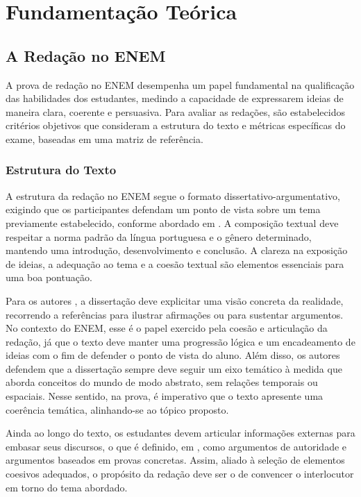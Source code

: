 \chapter{Fundamentação Teórica}

\section{A Redação no ENEM}

A prova de redação no ENEM desempenha um papel fundamental na qualificação das habilidades dos estudantes, medindo a capacidade de expressarem ideias de maneira clara, coerente e persuasiva. Para avaliar as redações, são estabelecidos critérios objetivos que consideram a estrutura do texto e métricas específicas do exame, baseadas em uma matriz de referência.

\subsection{Estrutura do Texto}

A estrutura da redação no ENEM segue o formato dissertativo-argumentativo, exigindo que os participantes defendam um ponto de vista sobre um tema previamente estabelecido, conforme abordado em \cite{cartilha-redacao}. A composição textual deve respeitar a norma padrão da língua portuguesa e o gênero determinado, mantendo uma introdução, desenvolvimento e conclusão. A clareza na exposição de ideias, a adequação ao tema e a coesão textual são elementos essenciais para uma boa pontuação.

Para os autores \citet{platao-e-fiorin}, a dissertação deve explicitar uma visão concreta da realidade, recorrendo a referências para ilustrar afirmações ou para sustentar argumentos. No contexto do ENEM, esse é o papel exercido pela coesão e articulação da redação, já que o texto deve manter uma progressão lógica e um encadeamento de ideias com o fim de defender o ponto de vista do aluno. Além disso, os autores defendem que a dissertação sempre deve seguir um eixo temático à medida que aborda conceitos do mundo de modo abstrato, sem relações temporais ou espaciais. Nesse sentido, na prova, é imperativo que o texto apresente uma coerência temática, alinhando-se ao tópico proposto.

Ainda ao longo do texto, os estudantes devem articular informações externas para embasar seus discursos, o que é definido, em \cite{platao-e-fiorin}, como argumentos de autoridade e argumentos baseados em provas concretas. Assim, aliado à seleção de elementos coesivos adequados, o propósito da redação deve ser o de convencer o interlocutor em torno do tema abordado.

